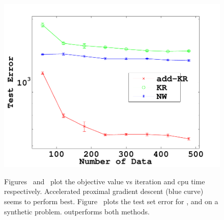 \begin{figure}
{  \includegraphics[width=\imarrwthree]{figs/toyResults}
  \vspace{\imlabelspace}
  \label{fig:compare}
} \\
\caption[]{ \hspace{-0.1in}
Figures~ and~ plot the objective value vs
iteration and cpu time respectively. Accelerated proximal gradient descent (blue
curve) seems to perform best. Figure~ plots the test set
error for \addkrrs, \krrs and \nws on a synthetic problem. 
\addkrrs outperforms both methods.
}
\label{fig:toythree}
\vspace{\imtextspace}
\end{figure}

